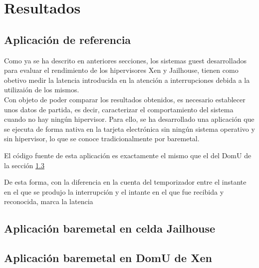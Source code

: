 \chapter{Resultados}

\section{Aplicación de referencia}

Como ya se ha descrito en anteriores secciones, los sistemas guest desarrollados para evaluar el rendimiento de los hipervisores Xen y Jailhouse, tienen como obetivo medir la latencia introducida en la atención a interrupciones debida a la utilizaión de los mismos. \\
Con objeto de poder comparar los resultados obtenidos, es necesario establecer unos datos de partida, es decir, caracterizar el comportamiento del sistema cuando no hay ningún hipervisor. Para ello, se ha desarrollado una aplicación que se ejecuta de forma nativa en la tarjeta electrónica sin ningún sistema operativo y sin hipervisor, lo que se conoce tradicionalmente por baremetal.

El código fuente de esta aplicación es exactamente el mismo que el del DomU de la sección \ref{}

De esta forma, con la diferencia en la cuenta del temporizador entre el instante en el que se produjo la interrupción y el intante en el que fue recibida y reconocida, marca la latencia

\section{Aplicación baremetal en celda Jailhouse}

\section{Aplicación baremetal en DomU de Xen}

\mydata

